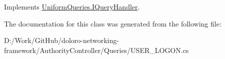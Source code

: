 Implements \mbox{\hyperlink{interface_uniform_queries_1_1_i_query_handler_abda1ccf47ad2889fbd015955965046e7}{Uniform\+Queries.\+I\+Query\+Handler}}.



The documentation for this class was generated from the following file\+:\begin{DoxyCompactItemize}
\item 
D\+:/\+Work/\+Git\+Hub/doloro-\/networking-\/framework/\+Authority\+Controller/\+Queries/U\+S\+E\+R\+\_\+\+L\+O\+G\+O\+N.\+cs\end{DoxyCompactItemize}
